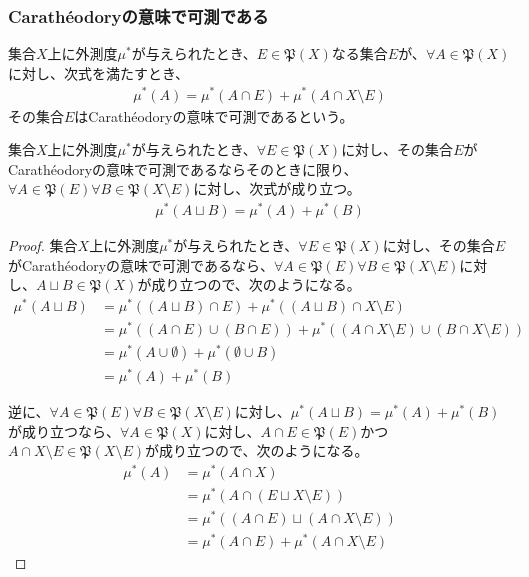 \documentclass[dvipdfmx]{jsarticle}
\begin{document}
\subsubsection{Carathéodoryの意味で可測である}%
\begin{dfn}
集合$X$上に外測度$\mu^{*}$が与えられたとき、$E \in \mathfrak{P}(X)$なる集合$E$が、$\forall A \in \mathfrak{P}(X)$に対し、次式を満たすとき、
\begin{align*}
\mu^{*}(A) = \mu^{*}(A \cap E) + \mu^{*}(A \cap X \setminus E)
\end{align*}
その集合$E$はCarathéodoryの意味で可測であるという。
\end{dfn}
\begin{thm}\label{4.5.3.3}
集合$X$上に外測度$\mu^{*}$が与えられたとき、$\forall E \in \mathfrak{P}(X)$に対し、その集合$E$がCarathéodoryの意味で可測であるならそのときに限り、$\forall A \in \mathfrak{P}(E)\forall B \in \mathfrak{P}(X \setminus E)$に対し、次式が成り立つ。
\begin{align*}
\mu^{*}(A \sqcup B) = \mu^{*}(A) + \mu^{*}(B)
\end{align*}
\end{thm}
\begin{proof}
集合$X$上に外測度$\mu^{*}$が与えられたとき、$\forall E \in \mathfrak{P}(X)$に対し、その集合$E$がCarathéodoryの意味で可測であるなら、$\forall A \in \mathfrak{P}(E)\forall B \in \mathfrak{P}(X \setminus E)$に対し、$A \sqcup B\in \mathfrak{P}(X)$が成り立つので、次のようになる。
\begin{align*}
\mu^{*}(A \sqcup B) &= \mu^{*}\left( (A \sqcup B) \cap E \right) + \mu^{*}\left( (A \sqcup B) \cap X \setminus E \right)\\
&= \mu^{*}\left( (A \cap E) \cup (B \cap E) \right) + \mu^{*}\left( (A \cap X \setminus E) \cup (B \cap X \setminus E) \right)\\
&= \mu^{*}(A \cup \emptyset) + \mu^{*}(\emptyset \cup B)\\
&= \mu^{*}(A) + \mu^{*}(B)
\end{align*}\par
逆に、$\forall A\in \mathfrak{P}(E)\forall B\in \mathfrak{P}(X \setminus E)$に対し、$\mu^{*}(A \sqcup B) = \mu^{*}(A) + \mu^{*}(B)$が成り立つなら、$\forall A \in \mathfrak{P}(X)$に対し、$A \cap E \in \mathfrak{P}(E)$かつ$A \cap X \setminus E \in \mathfrak{P}(X \setminus E)$が成り立つので、次のようになる。
\begin{align*}
\mu^{*}(A) &= \mu^{*}(A \cap X)\\
&= \mu^{*}\left( A \cap (E \sqcup X \setminus E) \right)\\
&= \mu^{*}\left( (A \cap E) \sqcup (A \cap X \setminus E) \right)\\
&= \mu^{*}(A \cap E) + \mu^{*}(A \cap X \setminus E)
\end{align*}
\end{proof}
\end{document}
